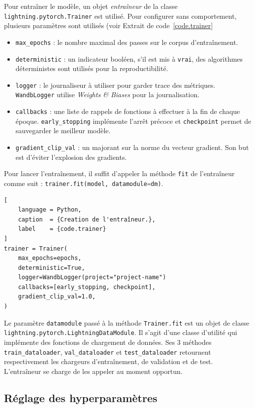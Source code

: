 Pour entraîner le modèle,
un objet \emph{entraîneur} de la classe \verb|lightning.pytorch.Trainer| est utilisé.
Pour configurer sans comportement, plusieurs paramètres sont utilisés (voir Extrait de code~\ref{code.trainer}
\begin{itemize}
    \item \verb|max_epochs| : le nombre maximal des passes sur le corpus d'entraînement.
    \item \verb|deterministic| : un indicateur booléen, s'il est mis à \verb|vrai|, 
    des algorithmes déterministes sont utilisés pour la reproductibilité.
    \item \verb|logger| : le journaliseur à utiliser pour garder trace des métriques.
    \verb|WandbLogger| utilise \emph{\foreignlanguage{english}{Weights \& Biases}} pour la journalisation.
    \item \verb|callbacks| : une liste de rappels de fonctions à effectuer à la fin de chaque époque.
    \verb|early_stopping| implémente l'arrêt précoce et \verb|checkpoint| permet de sauvegarder le meilleur modèle.
    \item \verb|gradient_clip_val| : un majorant sur la norme du vecteur gradient.
    Son but est d'éviter l'explosion des gradients.
\end{itemize}
Pour lancer l'entraînement, il suffit d'appeler la méthode \verb|fit| de l'entraîneur comme suit :
\lstinline[language=Python]|trainer.fit(model, datamodule=dm)|.

\begin{lstlisting}[
    language = Python,
    caption  = {Creation de l'entraîneur.},
    label    = {code.trainer}
]
trainer = Trainer(
    max_epochs=epochs,
    deterministic=True,
    logger=WandbLogger(project="project-name")
    callbacks=[early_stopping, checkpoint],
    gradient_clip_val=1.0,
)
\end{lstlisting}

Le paramètre \verb|datamodule| passé à la méthode \verb|Trainer.fit| est un objet de classe
\verb|lightning.pytorch.LightningDataModule|.
Il s'agit d'une classe d'utilité qui implémente des fonctions de chargement de données.
Ses 3 méthodes \verb|train_dataloader|, \verb|val_dataloader| et \verb|test_dataloader|
retournent respectivement les chargeurs d'entraînement, de validation et de test.
L'entraîneur se charge de les appeler au moment opportun.

\subsection{Réglage des hyperparamètres}%
\label{subsec.hparam-tuning}

